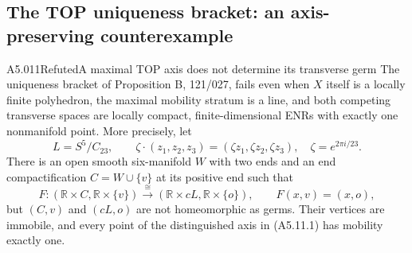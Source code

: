 \subsection{The TOP uniqueness bracket: an axis-preserving counterexample}
\begin{saresult}{A5.011}{Refuted}{A maximal TOP axis does not determine its transverse germ}
The uniqueness bracket of Proposition B, 121/027, fails even when
$X$ itself is a locally finite polyhedron, the maximal mobility
stratum is a line, and both competing transverse spaces are locally
compact, finite-dimensional ENRs with exactly one nonmanifold point.
More precisely, let
\[
 L=S^5/C_{23},\qquad
 \zeta\cdot(z_1,z_2,z_3)=(\zeta z_1,\zeta z_2,\zeta z_3),
 \quad \zeta=e^{2\pi i/23}.
\]
There is an open smooth six-manifold $W$ with two ends and an end
compactification $C=W\cup\{v\}$ at its positive end such that
\[
 F:(\mathbb R\times C,\mathbb R\times\{v\})
       \xrightarrow{\ \cong\ }
   (\mathbb R\times cL,\mathbb R\times\{o\}),
 \qquad F(x,v)=(x,o),                                      \tag{A5.11.1}
\]
but $(C,v)$ and $(cL,o)$ are not homeomorphic as germs.
Their vertices are immobile, and every point of the distinguished
axis in (A5.11.1) has mobility exactly one.
\end{saresult}
